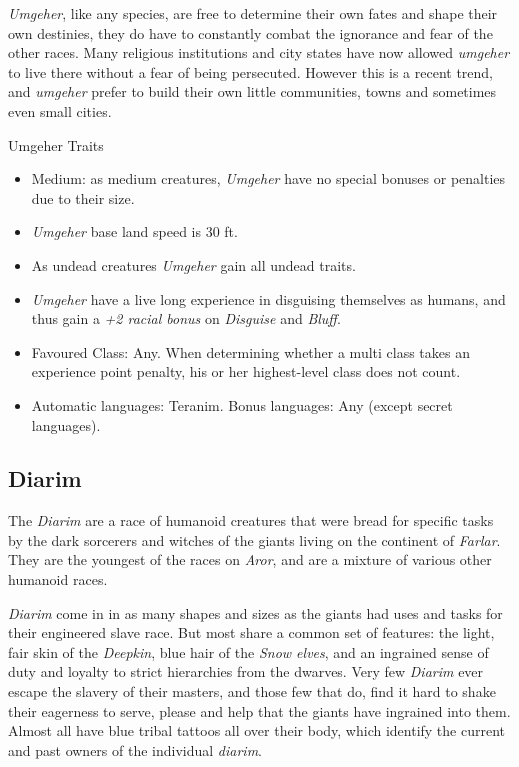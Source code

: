 \emph{Umgeher}, like any species, are free to determine their own fates and
shape their own destinies, they do have to constantly combat the ignorance and
fear of the other races. Many religious institutions and city states have now
allowed \emph{umgeher} to live there without a fear of being persecuted.
However this is a recent trend, and \emph{umgeher} prefer to build their own
little communities, towns and sometimes even small cities.

\begin{35e}{Umgeher Traits}
  \begin{itemize}[noitemsep]
    \item Medium: as medium creatures, \emph{Umgeher} have no special bonuses or
    penalties due to their size.
    \item \emph{Umgeher} base land speed is 30 ft.
    \item As undead creatures \emph{Umgeher} gain all undead traits.
    \item \emph{Umgeher} have a live long experience in disguising themselves as
    humans, and thus gain a \emph{+2 racial bonus} on \emph{Disguise} and
    \emph{Bluff}.
    \item Favoured Class: Any. When determining whether a multi class takes an
    experience point penalty, his or her highest-level class does not count.
    \item Automatic languages: Teranim. Bonus languages: Any (except secret
    languages).
  \end{itemize}
\end{35e}

\subsection{Diarim}
\label{sec:Diarim}


The \emph{Diarim} are a race of humanoid creatures that were bread for
specific tasks by the dark sorcerers and witches of the giants living on the
continent of \emph{Farlar}. They are the youngest of the races on \emph{Aror},
and are a mixture of various other humanoid races.

\emph{Diarim} come in in as many shapes and sizes as the giants had uses and
tasks for their engineered slave race. But most share a common set of features:
the light, fair skin of the \emph{Deepkin}, blue hair of the \emph{Snow elves},
and an ingrained sense of duty and loyalty to strict hierarchies from the
dwarves. Very few \emph{Diarim} ever escape the slavery of their masters, and
those few that do, find it hard to shake their eagerness to serve, please and
help that the giants have ingrained into them. Almost all have blue tribal
tattoos all over their body, which identify the current and past owners of the
individual \emph{diarim}.

